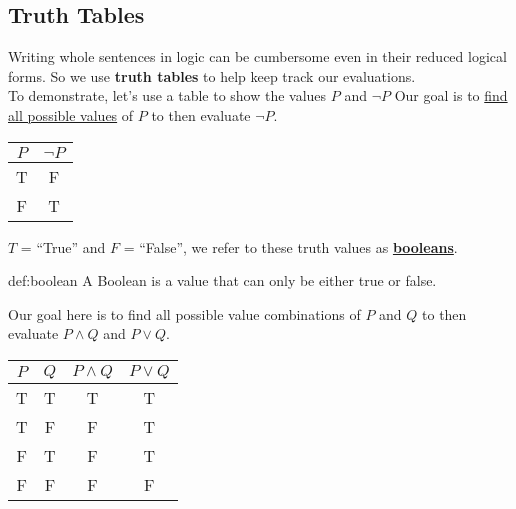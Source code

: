 \subsection{Truth Tables}
Writing whole sentences in logic can be cumbersome even in their reduced logical forms.
So we use \textbf{truth tables} to help keep track our evaluations.\\

\noindent
To demonstrate, let's use a table to show the values $P$ and $\neg P$ Our goal is to
\underline{find all possible values} of $P$ to then evaluate $\neg P$.

\begin{center}
    \begin{tabular}{|c|c|}
        \hline
        \rowcolor{OliveGreen!10}
        $P$ & $\neg P$ \\
        \hline
        T   & F        \\
        F   & T        \\
        \hline
    \end{tabular}
\end{center}
\noindent
$T$ = ``True'' and $F$ = ``False'', we refer to these truth values as \underline{\textbf{booleans}}.\\


\begin{Def}[Boolean]{def:boolean}
    A Boolean is a value that can only be either true or false.
\end{Def}

\newpage

\noindent
Our goal here is to find all possible value combinations of $P$ and $Q$ to then evaluate $P \land Q$ and $P \lor Q$.\\


\begin{center}
    \begin{tabular}{|c|c|c|c|}
        \hline
        \rowcolor{OliveGreen!10}
        $P$ & $Q$ & $P \land Q$ & $P \lor Q$ \\
        \hline
        T   & T   & T           & T          \\
        T   & F   & F           & T          \\
        F   & T   & F           & T          \\
        F   & F   & F           & F          \\
        \hline
    \end{tabular}
\end{center}

